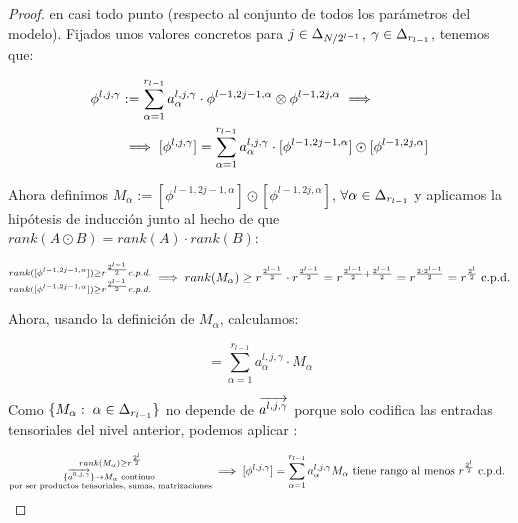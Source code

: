 \begin{proof}
    en casi todo punto (respecto al conjunto de todos los parámetros del modelo). Fijados unos valores concretos para $j \in \Delta_{N/2^{l-1}}$, $\gamma \in \Delta_{r_{l-1}}$, tenemos que:

    \begin{equation}
    \begin{split}
        \phi^{l, j, \gamma} &:= \sum_{\alpha = 1}^{r_{l-1}} a_{\alpha}^{l, j, \gamma} \cdot \phi^{l-1, 2j-1, \alpha} \otimes \phi^{l-1, 2j, \alpha} \implies \\
        &\implies [\phi^{l, j, \gamma}] = \sum_{\alpha = 1}^{r_{l-1}} a_{\alpha}^{l, j, \gamma} \cdot [\phi^{l-1, 2j-1, \alpha}] \odot [\phi^{l-1, 2j, \alpha}]
    \end{split}
    \end{equation}

    Ahora definimos $M_\alpha := [\phi^{l-1, 2j-1, \alpha}] \odot [\phi^{l-1, 2j, \alpha}]$, $\forall \alpha \in \Delta_{r_{l-1}}$ y aplicamos la hipótesis de inducción junto al hecho de que $rank(A \odot B) = rank(A) \cdot rank(B)$:

    \begin{equation}
    \begin{split}
        \substack{rank([\phi^{l-1, 2j-1, \alpha}]) \geq r^{\frac{2^{l-1}}{2}} c.p.d. \\ rank([\phi^{l-1, 2j-1, \alpha}]) \geq r^{\frac{2^{l-1}}{2}} c.p.d.} \implies         rank(M_\alpha) \geq r^{\frac{2^{l-1}}{2}} \cdot r^{\frac{2^{l-1}}{2}} = r^{\frac{2^{l-1}}{2} + \frac{2^{l-1}}{2}} =
        r^{\frac{2 \cdot 2^{l - 1}}{2}} = r^{\frac{2^{l}}{2}} \; \text{c.p.d.} \\
    \end{split}
    \end{equation}

    Ahora, usando la definición de $M_\alpha$, calculamos:

    \begin{equation}
        [\phi^{l, j, \gamma}] = \sum_{\alpha = 1}^{r_{l-1}} a_{\alpha}^{l, j, \gamma} \cdot M_\alpha
    \end{equation}

    Como $\{ M_\alpha: \; \alpha \in \Delta_{r_{l-1}} \}$ no depende de $\overrightarrow{a^{l, j, \gamma}}$ porque solo codifica las entradas tensoriales del nivel anterior, podemos aplicar :

    \begin{equation}
        \substack{
            rank(M_\alpha) \geq r^{\frac{2^l}{2}}\\
            \{ \overrightarrow{a^{0, j, \gamma}} \} \to M_\alpha \text{ continuo } \\
            \text{por ser productos tensoriales, sumas, matrizaciones}
        } \implies
        [\phi^{l, j, \gamma}] = \sum_{\alpha = 1}^{r_{l-1}} a_\alpha^{l,j,\gamma} M_\alpha \text{ tiene rango al menos } r^{\frac{2^l}{2}} \text{ c.p.d. }
    \end{equation}


\end{proof}
